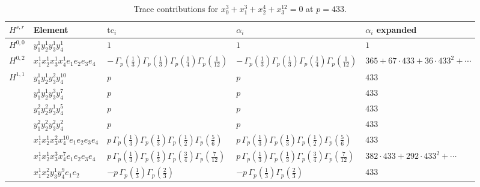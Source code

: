 \documentclass[11pt]{article}
\begin{document}
\begin{table}[ht]
\centering
\caption{Trace contributions for $x_0^{3} + x_1^{3} + x_2^{4} + x_3^{12} = 0$ at $p=433$.}\label{tab:diagonal-8}
\renewcommand{\arraystretch}{1.1}
{\scriptsize
\begin{tabular}{@{}lllll@{}}
\toprule
$H^{s,r}$ & Element & $\mathrm{tc}_i$ & $\alpha_i$ & $\alpha_i$ expanded \\
\midrule
$H^{0,0}$ & $y_{1}^{1} y_{2}^{1} y_{3}^{1} y_{4}^{1}$ & $1$ & $1$ & $1$ \\
\midrule
$H^{0,2}$ & $x_{1}^{1} x_{2}^{1} x_{3}^{1} x_{4}^{1}  e_{1} e_{2} e_{3} e_{4}$ & $- \, \Gamma_p \left( \frac{1}{3} \right) \Gamma_p \left( \frac{1}{3} \right) \Gamma_p \left( \frac{1}{4} \right) \Gamma_p \left( \frac{1}{12} \right)$ & $- \, \Gamma_p \left( \frac{1}{3} \right) \Gamma_p \left( \frac{1}{3} \right) \Gamma_p \left( \frac{1}{4} \right) \Gamma_p \left( \frac{1}{12} \right)$ & $365{+}67{\cdot}433{+}36{\cdot}433^{2}{+}\cdots$ \\
\midrule
$H^{1,1}$ & $y_{1}^{1} y_{2}^{1} y_{3}^{2} y_{4}^{10}$ & $p \,$ & $p \,$ & $433$ \\
 & $y_{1}^{1} y_{2}^{1} y_{3}^{3} y_{4}^{7}$ & $p \,$ & $p \,$ & $433$ \\
 & $y_{1}^{2} y_{2}^{2} y_{3}^{1} y_{4}^{5}$ & $p \,$ & $p \,$ & $433$ \\
 & $y_{1}^{2} y_{2}^{2} y_{3}^{2} y_{4}^{2}$ & $p \,$ & $p \,$ & $433$ \\
 & $x_{1}^{1} x_{2}^{1} x_{3}^{2} x_{4}^{10}  e_{1} e_{2} e_{3} e_{4}$ & $p \, \Gamma_p \left( \frac{1}{3} \right) \Gamma_p \left( \frac{1}{3} \right) \Gamma_p \left( \frac{1}{2} \right) \Gamma_p \left( \frac{5}{6} \right)$ & $p \, \Gamma_p \left( \frac{1}{3} \right) \Gamma_p \left( \frac{1}{3} \right) \Gamma_p \left( \frac{1}{2} \right) \Gamma_p \left( \frac{5}{6} \right)$ & $433$ \\
 & $x_{1}^{1} x_{2}^{1} x_{3}^{3} x_{4}^{7}  e_{1} e_{2} e_{3} e_{4}$ & $p \, \Gamma_p \left( \frac{1}{3} \right) \Gamma_p \left( \frac{1}{3} \right) \Gamma_p \left( \frac{3}{4} \right) \Gamma_p \left( \frac{7}{12} \right)$ & $p \, \Gamma_p \left( \frac{1}{3} \right) \Gamma_p \left( \frac{1}{3} \right) \Gamma_p \left( \frac{3}{4} \right) \Gamma_p \left( \frac{7}{12} \right)$ & $382{\cdot}433{+}292{\cdot}433^{2}{+}\cdots$ \\
 & $x_{1}^{1} x_{2}^{2} y_{3}^{1} y_{4}^{9} e_{1} e_{2}$ & $- p \, \Gamma_p \left( \frac{1}{3} \right) \Gamma_p \left( \frac{2}{3} \right)$ & $- p \, \Gamma_p \left( \frac{1}{3} \right) \Gamma_p \left( \frac{2}{3} \right)$ & $433$ \\

\end{tabular}}
\end{table}
\end{document}
